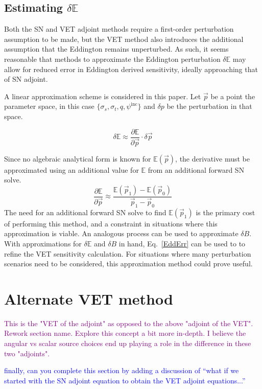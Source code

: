 \documentclass[12pt]{report}
\newcommand{\vp}{\vec{p}}
\newcommand{\Edd}{\mathbb{E}}
\newcommand{\BEdd}{B}
\newcommand{\comment}[2]{\marginpar{\textcolor{#2}{$\star$}}\textcolor{#2}{#1}\newline}
\newcommand{\jcr}[1]{\comment{#1}{blue}}
\newcommand{\todo}[1]{\comment{#1}{purple}}
\newcommand{\jcr}[1]{\phantom{a}}
\newcommand{\todo}[1]{\phantom{a}}
\begin{document}
\subsection{Estimating $\delta \Edd$}
Both the SN and VET adjoint methods require a first-order perturbation assumption to be made, but the VET method also introduces the additional assumption that the Eddington remains unperturbed. As such, it seems reasonable that methods to approximate the Eddington perturbation $\delta \Edd$ may allow for reduced error in Eddington derived sensitivity, ideally approaching that of SN adjoint. 

A linear approximation scheme is considered in this paper. Let $\vp$ be a point the  parameter space, in this case $\lbrace \sigma_s , \sigma_t, q, \psi^{\text{inc}} \rbrace$ and $\delta p$ be the perturbation in that space.

\begin{equation}
\delta \Edd \approx \frac{\partial \Edd}{\partial \vp} \cdot \delta \vp
\end{equation}

Since no algebraic analytical form is known for $\Edd ( \vp )$, the derivative must be approximated using an additional value for $\Edd$ from an additional forward SN solve.
\begin{equation}
\label{Eddapprox}
\frac{\partial \Edd}{\partial \vp} \approx \frac{\Edd(\vp_1) - \Edd(\vp_0)}{\vp_1 - \vp_0}
\end{equation}
The need for an additional forward SN solve to find $\Edd(\vp_1)$ is the primary cost of performing this method, and a constraint in situations where this approximation is viable. An analogous process can be used to approximate $\delta \BEdd$. With approximations for $\delta \Edd$ and $\delta \BEdd$ in hand, Eq.~\eqref{EddErr} can be used to to refine the VET sensitivity calculation. For situations where many perturbation scenarios need to be considered, this approximation method could prove useful. 

\section{Alternate VET method}
\todo{This is the "VET of the adjoint" as opposed to the above "adjoint of the VET". Rework section name. Explore this concept a bit more in-depth. I believe the angular vs scalar source choices end up playing a role in the difference in these two "adjoints".}


\jcr{finally, can you complete this section by adding a discussion of "`what if we started with the SN adjoint equation to obtain the VET adjoint equations..."'}
\end{document}

